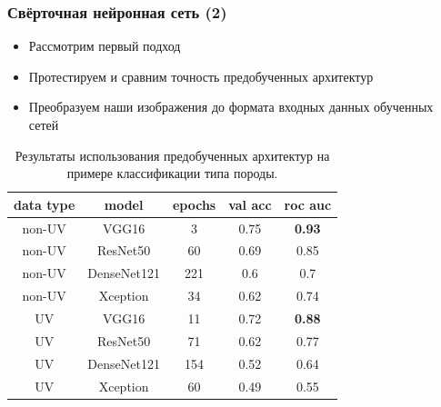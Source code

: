 \documentclass[xetex,mathserif,serif]{beamer}
\begin{document}
	
	\begin{frame}
		\frametitle{Свёрточная нейронная сеть (2)}
		
        \begin{itemize}
            \item Рассмотрим первый подход
            \item Протестируем и сравним точность предобученных архитектур
            \item Преобразуем наши изображения до формата входных данных обученных сетей
        \end{itemize} 
        
        \begin{table}[h!]
            \centering
            \begin{tabular}{|c|c|c|c|c|}
            \hline
            \textbf{data type} & \textbf{model} & \textbf{epochs} & \textbf{val acc} & \textbf{roc auc} \\ \hline
            non-UV             & VGG16          & 3               & 0.75             & \textbf{0.93}    \\ \hline
            non-UV             & ResNet50       & 60              & 0.69             & 0.85             \\ \hline
            non-UV             & DenseNet121    & 221             & 0.6              & 0.7              \\ \hline
            non-UV             & Xception       & 34              & 0.62             & 0.74             \\ \hline
            UV                 & VGG16          & 11              & 0.72             & \textbf{0.88}    \\ \hline
            UV                 & ResNet50       & 71              & 0.62             & 0.77             \\ \hline
            UV                 & DenseNet121    & 154             & 0.52             & 0.64             \\ \hline
            UV                 & Xception       & 60              & 0.49             & 0.55             \\ \hline
            \end{tabular}
            \caption{Результаты использования предобученных архитектур на примере классификации типа породы.}
            \label{results}   
        \end{table}        
        
	\end{frame}	
	
\end{document}

